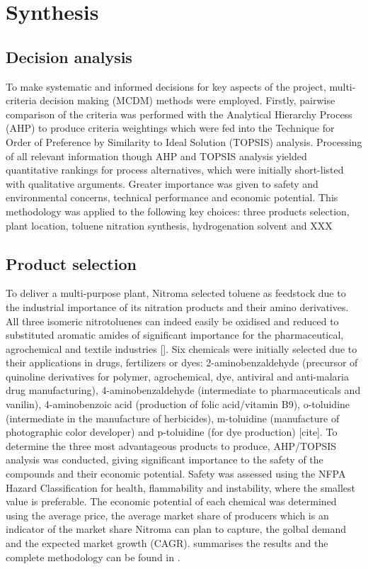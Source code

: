 \section{Synthesis}
\label{sec:synthesis}
\subsection{Decision analysis}
To make systematic and informed decisions for key aspects of the project, multi-criteria decision making (MCDM) methods were employed. Firstly, pairwise comparison of the criteria was performed with the Analytical Hierarchy Process (AHP) to produce criteria weightings which were fed into the Technique for Order of Preference by Similarity to Ideal Solution (TOPSIS) analysis. Processing of all relevant information though AHP and TOPSIS analysis yielded quantitative rankings for process alternatives, which were initially short-listed with qualitative arguments. Greater importance was given to safety and environmental concerns, technical performance and economic potential.
This methodology was applied to the following key choices: three products selection, plant location, toluene nitration synthesis, hydrogenation solvent and XXX 

\subsection{Product selection}
To deliver a multi-purpose plant, Nitroma selected toluene as feedstock due to the industrial importance of its nitration products and their amino derivatives. All three isomeric nitrotoluenes can indeed easily be oxidised and reduced to substituted aromatic amides of significant importance for the pharmaceutical, agrochemical and textile industries []. Six chemicals were initially selected due to their applications in drugs, fertilizers or dyes: 2-aminobenzaldehyde (precursor of quinoline derivatives for polymer, agrochemical, dye, antiviral and anti-malaria drug manufacturing), 4-aminobenzaldehyde (intermediate to pharmaceuticals and vanilin), 4-aminobenzoic acid (production of folic acid/vitamin B9), o-toluidine (intermediate in the manufacture of herbicides), m-toluidine (manufacture of  photographic color developer) and p-toluidine (for dye production) [cite]. To determine the three most advantageous products to produce, AHP/TOPSIS analysis was conducted, giving significant importance to the safety of the compounds and their economic potential. Safety was assessed using the NFPA Hazard Classification for health, flammability and instability, where the smallest value is preferable. The economic potential of each chemical was determined using the average price, the average market share of producers which is an indicator of the market share Nitroma can plan to capture, the golbal demand and the expected market growth (CAGR).  summarises the results and the complete methodology can be found in .   


